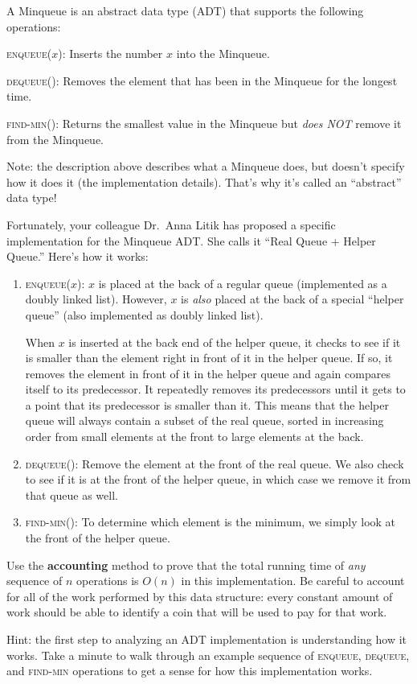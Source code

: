 \documentclass[12 pt, letterpaper]{hmcpset}
\begin{document}
\begin{problem}
	A Minqueue is an abstract data type (ADT) that supports the following operations:		
    \begin{description}
        \item{\textsc{enqueue}($x$):}  Inserts the number $x$ into the Minqueue.
        \item{\textsc{dequeue}():}  Removes the element that has been in the
        Minqueue for the longest time.
        \item{\textsc{find-min}():}   Returns the smallest value in the Minqueue
        but \emph{does NOT} remove it from the Minqueue.
    \end{description}
    Note: the description above describes what a Minqueue does, but doesn't specify how it does it (the implementation details). That's why it's called an ``abstract'' data type!
    
    Fortunately, your colleague Dr.~Anna Litik has proposed a specific implementation for the Minqueue ADT. She calls it ``Real Queue + Helper Queue.''
    Here's how it works:  
    \begin{enumerate}[label = \arabic*.]
        \item  \textsc{enqueue}($x$): $x$ is placed at the back of a regular queue (implemented as a doubly linked list). However, $x$ is \emph{also} placed at the back of a special ``helper queue'' (also implemented as doubly linked list).  

        When $x$ is inserted at the back end of the helper queue, it checks to see if it is smaller than the element right in front of it in the helper queue.  If so, it removes the element in front of it in the helper queue and again compares itself to its predecessor.  It repeatedly removes its predecessors until it gets to a point that its predecessor is smaller than it. This means that the helper queue will always contain a subset of the real queue, sorted in increasing order from small elements at the front to large elements at the back. 
        \item \textsc{dequeue}(): Remove the element at the front of the real queue. We also check to see if it is at the front of the helper queue, in which case we remove it from that queue as well.
        \item \textsc{find-min}(): To determine which element is the minimum, we simply look at the front of the helper queue.
    \end{enumerate}
   
    Use the \textbf{accounting} method to prove that the total running time of \emph{any} sequence of $n$ operations is $O(n)$ in this implementation. Be careful to account for all of the
    work performed by this data structure: every constant amount of work should be able to identify a coin that will be used to pay for that work.

    Hint: the first step to analyzing an ADT implementation is understanding how it works. Take a minute to walk through an example sequence of \textsc{enqueue}, \textsc{dequeue}, and \textsc{find-min} operations to get a sense for how this implementation works.
\end{problem}
\end{document}
